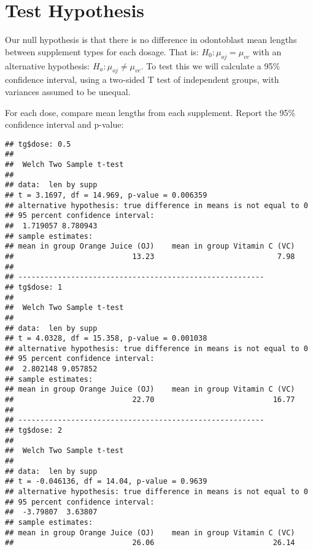 \documentclass[legalpaper]{article}
\newenvironment{Shaded}{\begin{snugshade}}{\end{snugshade}}
\newcommand{\KeywordTok}[1]{\textcolor[rgb]{0.13,0.29,0.53}{\textbf{{#1}}}}
\newcommand{\DataTypeTok}[1]{\textcolor[rgb]{0.13,0.29,0.53}{{#1}}}
\newcommand{\StringTok}[1]{\textcolor[rgb]{0.31,0.60,0.02}{{#1}}}
\newcommand{\NormalTok}[1]{{#1}}
\begin{document}
\section{Test Hypothesis}\label{test-hypothesis}

Our null hypothesis is that there is no difference in odontoblast mean
lengths between supplement types for each dosage. That is:
\(H_0 : \mu_{oj} = \mu_{vc}\) with an alternative hypothesis:
\(H_a : \mu_{oj} \ne \mu_{vc}\). To test this we will calculate a 95\%
confidence interval, using a two-sided T test of independent groups,
with variances assumed to be unequal.

For each dose, compare mean lengths from each supplement. Report the
95\% confidence interval and p-value:

\begin{Shaded}
\end{Shaded}

\begin{verbatim}
## tg$dose: 0.5
## 
##  Welch Two Sample t-test
## 
## data:  len by supp
## t = 3.1697, df = 14.969, p-value = 0.006359
## alternative hypothesis: true difference in means is not equal to 0
## 95 percent confidence interval:
##  1.719057 8.780943
## sample estimates:
## mean in group Orange Juice (OJ)    mean in group Vitamin C (VC) 
##                           13.23                            7.98 
## 
## -------------------------------------------------------- 
## tg$dose: 1
## 
##  Welch Two Sample t-test
## 
## data:  len by supp
## t = 4.0328, df = 15.358, p-value = 0.001038
## alternative hypothesis: true difference in means is not equal to 0
## 95 percent confidence interval:
##  2.802148 9.057852
## sample estimates:
## mean in group Orange Juice (OJ)    mean in group Vitamin C (VC) 
##                           22.70                           16.77 
## 
## -------------------------------------------------------- 
## tg$dose: 2
## 
##  Welch Two Sample t-test
## 
## data:  len by supp
## t = -0.046136, df = 14.04, p-value = 0.9639
## alternative hypothesis: true difference in means is not equal to 0
## 95 percent confidence interval:
##  -3.79807  3.63807
## sample estimates:
## mean in group Orange Juice (OJ)    mean in group Vitamin C (VC) 
##                           26.06                           26.14
\end{verbatim}
\end{document}
